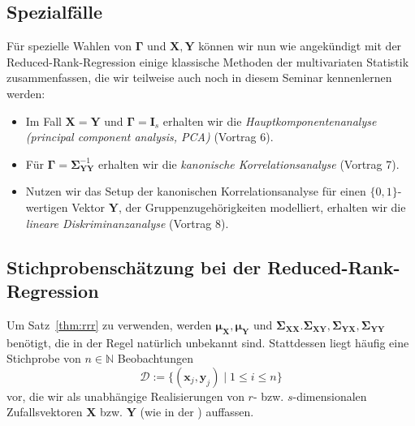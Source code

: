 \documentclass[]{article}
\newcommand{\N}{\mathbb{N}}
\newcommand{\X}{\mathbf{X}}
\newcommand{\Y}{\mathbf{Y}}
\newcommand{\muu}{\bm{\mu}}
\newcommand{\Ssigma}{\mathbf{\Sigma}}
\newcommand{\Ggamma}{\mathbf{\Gamma}}
\newcommand{\xx}{\mathbf{x}}
\newcommand{\yy}{\mathbf{y}}
\begin{document}
\subsection*{Spezialfälle}

Für spezielle Wahlen von $\Ggamma$ und $\X, \Y$ können wir nun wie angekündigt mit der Reduced-Rank-Regression einige klassische Methoden der multivariaten Statistik zusammenfassen, die wir teilweise auch noch in diesem Seminar kennenlernen werden:
\begin{itemize}
	\item Im Fall $\X = \Y$ und $\Ggamma = \mathbf{I}_s$ erhalten wir die \textit{Hauptkomponentenanalyse (principal component analysis, PCA)} (Vortrag 6).
	\item Für $\Ggamma = \Ssigma_{\Y\Y}^{-1}$ erhalten wir die \textit{kanonische Korrelationsanalyse} (Vortrag 7).
	\item Nutzen wir das Setup der kanonischen Korrelationsanalyse für einen $\{0, 1\}$-wertigen Vektor $\Y$, der Gruppenzugehörigkeiten modelliert, erhalten wir die \textit{lineare Diskriminanzanalyse} (Vortrag 8).
\end{itemize}

\subsection*{Stichprobenschätzung bei der Reduced-Rank-Regression}

Um Satz~\ref{thm:rrr} zu verwenden, werden $\muu_\X, \muu_\Y$ und $\Ssigma_{\X\X}. \Ssigma_{\X\Y}, \Ssigma_{\Y\X}, \Ssigma_{\Y\Y}$ benötigt, die in der Regel natürlich unbekannt sind. Stattdessen liegt häufig eine Stichprobe von $n \in \N$ Beobachtungen 
\[\mathcal{D} := \{(\xx_j, \yy_j) \;|\; 1 \leq i \leq n\} \label{eq:3.5} \tag{3.5}\]
vor, die wir als unabhängige Realisierungen von $r$- bzw. $s$-dimensionalen Zufallsvektoren $\X$ bzw. $\Y$ (wie in der ) auffassen.
\end{document}
